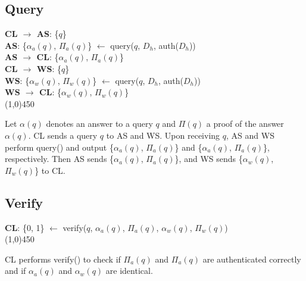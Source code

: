 \subsection{Query}
\begin{framed}
\noindent
\textbf{CL $\rightarrow$ AS}: \textsf{\{$q$\}}	\\
\textbf{AS}: \textsf{\{$\alpha_a(q)$, $\Pi_a(q)$\} $\leftarrow$ query($q$, $D_h$, auth($D_h$))}	\\
\textbf{AS $\rightarrow$ CL}: \textsf{\{$\alpha_a(q)$, $\Pi_a(q)$\}}	\\

\noindent
\textbf{CL $\rightarrow$ WS}: \textsf{\{$q$\}}	\\
\textbf{WS}: \textsf{\{$\alpha_w(q)$, $\Pi_w(q)$\} $\leftarrow$ query($q$, $D_h$, auth($D_h$))}	\\
\textbf{WS $\rightarrow$ CL}: \textsf{\{$\alpha_w(q)$, $\Pi_w(q)$\}}	\\
\line(1,0){450}

\noindent
Let $\alpha(q)$ denotes an answer to a query $q$ and $\Pi(q)$ a proof of the answer $\alpha(q)$. 
\textsf{CL} sends a query $q$ to \textsf{AS} and \textsf{WS}. 
Upon receiving $q$, \textsf{AS} and \textsf{WS} perform \textsf{query()} and output \textsf{\{$\alpha_a(q)$, $\Pi_a(q)$\}} and \textsf{\{$\alpha_a(q)$, $\Pi_a(q)$\}}, respectively.
Then \textsf{AS} sends \textsf{\{$\alpha_a(q)$, $\Pi_a(q)$\}}, and \textsf{WS} sends \textsf{\{$\alpha_w(q)$, $\Pi_w(q)$\}} to \textsf{CL}.
\end{framed}

\subsection{Verify}
\begin{framed}
\noindent
\textbf{CL}: \textsf{\{0, 1\} $\leftarrow$ verify($q$, $\alpha_a(q)$, $\Pi_a(q)$, $\alpha_w(q)$, $\Pi_w(q)$)}	\\
\line(1,0){450}

\noindent
\textsf{CL} performs \textsf{verify()} to check if $\Pi_a(q)$ and $\Pi_a(q)$ are authenticated correctly and if $\alpha_a(q)$ and $\alpha_w(q)$ are identical.

\end{framed}

